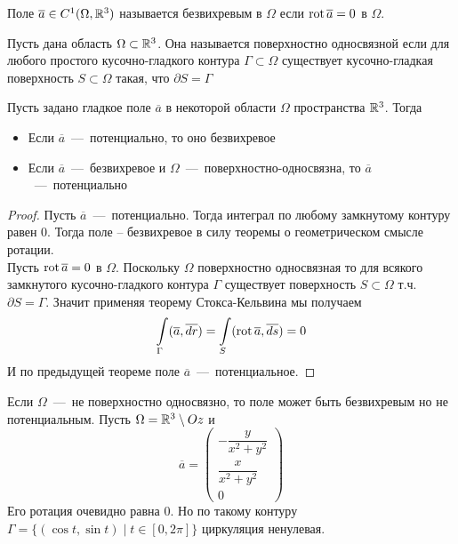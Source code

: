 \begin{definition}
    Поле $\overline{a} \in C^1(\Omega, \mathbb{R}^3)$ называется безвихревым в $\Omega$ если $\operatorname{rot} \overline{a} = 0$ в $\Omega$.
\end{definition}
\begin{definition}
    Пусть дана область $\Omega \subset \mathbb{R}^3$. Она называется поверхностно односвязной если для любого простого кусочно-гладкого контура $\Gamma \subset \Omega$ существует кусочно-гладкая поверхность $S \subset \Omega$ такая, что $\partial S = \Gamma$
\end{definition}
\begin{theorem}
    Пусть задано гладкое поле $\overline{a}$ в некоторой области $\Omega$ пространства $\mathbb{R}^3$. Тогда
    \begin{itemize}
        \item Если $\overline{a}$~---~потенциально, то оно безвихревое
        \item Если $\overline{a}$~---~безвихревое и $\Omega$~---~поверхностно-односвязна, то $\overline{a}$~---~потенциально
    \end{itemize}
\end{theorem}
\begin{proof}
    Пусть $\overline{a}$~---~потенциально. Тогда интеграл по любому замкнутому контуру равен 0. Тогда поле -- безвихревое в силу теоремы о геометрическом смысле ротации. \\
    Пусть $\operatorname{rot} \overline{a} = 0$ в $\Omega$. Поскольку $\Omega$ поверхностно односвязная то для всякого замкнутого кусочно-гладкого контура $\Gamma$ существует поверхность $S \subset \Omega$ т.ч. $\partial S = \Gamma$. Значит применяя теорему Стокса-Кельвина мы получаем \[\int\limits_\Gamma (\overline{a}, \overline{dr}) = \int\limits_S (\operatorname{rot} \overline{a}, \overline{ds}) = 0\]
    И по предыдущей теореме поле $\overline{a}$~---~потенциальное.
\end{proof}
\begin{note}
    Если $\Omega$~---~не поверхностно односвязно, то поле может быть безвихревым но не потенциальным. Пусть $\Omega = \mathbb{R}^3 \setminus Oz$ и \[
    \overline{a} = \begin{pmatrix}
        -\dfrac{y}{x^2 + y^2} \\ \dfrac{x}{x^2 + y^2} \\ 0
    \end{pmatrix}
    \]
    Его ротация очевидно равна 0. Но по такому контуру $\Gamma = \{(\cos t, \sin t) \mid t \in [0, 2\pi]\}$
    циркуляция ненулевая.
\end{note}
    